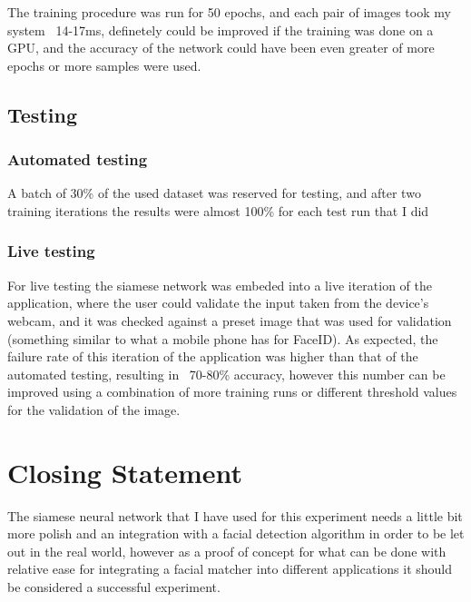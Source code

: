 \documentclass[12pt]{article} %
\begin{document}
	 The training procedure was run for 50 epochs, and each pair of images took my system ~14-17ms, definetely could be improved if the training was done on a GPU, and the accuracy of the network could have been even greater of more epochs or more samples were used.


\subsection{Testing}

	\subsubsection{Automated testing}

	A batch of 30\% of the used dataset was reserved for testing, and after two training iterations the results were almost 100\% for each test run that I did

	\subsubsection{Live testing}

	For live testing the siamese network was embeded into a live iteration of the application, where the user could validate the input taken from the device's webcam, and it was checked against a preset image that was used for validation (something similar to what a mobile phone has for FaceID).
	As expected, the failure rate of this iteration of the application was higher than that of the automated testing, resulting in ~70-80\% accuracy, however this number can be improved using a combination of more training runs or different threshold values for the validation of the image.


\section{Closing Statement}

	The siamese neural network \cite{a4} that I have used for this experiment needs a little bit more polish and an integration with a facial detection algorithm\cite{v2}\cite{a3} in order to be let out in the real world, however as a proof of concept for what can be done with relative ease for integrating a facial matcher into different applications it should be considered a successful experiment.




\end{document}
